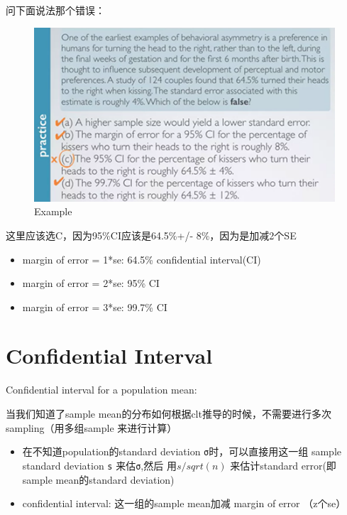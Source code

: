 \documentclass[]{book}
\providecommand{\tightlist}{%
  \setlength{\itemsep}{0pt}\setlength{\parskip}{0pt}}
\begin{document}
问下面说法那个错误：

\begin{figure}

{\centering \includegraphics[width=0.8\linewidth]{graphs/2-5} 

}

\caption{Example}\label{fig:fig2-5}
\end{figure}

这里应该选C，因为95\%CI应该是64.5\%+/- 8\%，因为是加减2个SE

\begin{itemize}
\tightlist
\item
  margin of error = 1*se: 64.5\% confidential interval(CI)
\item
  margin of error = 2*se: 95\% CI
\item
  margin of error = 3*se: 99.7\% CI
\end{itemize}

\section{Confidential Interval}\label{confidential-interval}

Confidential interval for a population mean:

当我们知道了sample
mean的分布如何根据clt推导的时候，不需要进行多次sampling（用多组sample
来进行计算）

\begin{itemize}
\tightlist
\item
  在不知道population的standard deviation \texttt{σ}时，可以直接用这一组
  sample standard deviation \texttt{s} 来估\texttt{σ},然后
  用\(s/sqrt(n)\) 来估计standard error(即sample mean的standard
  deviation)
\item
  confidential interval: 这一组的sample mean加减 margin of error
  （z个se）
\end{itemize}
\end{document}
